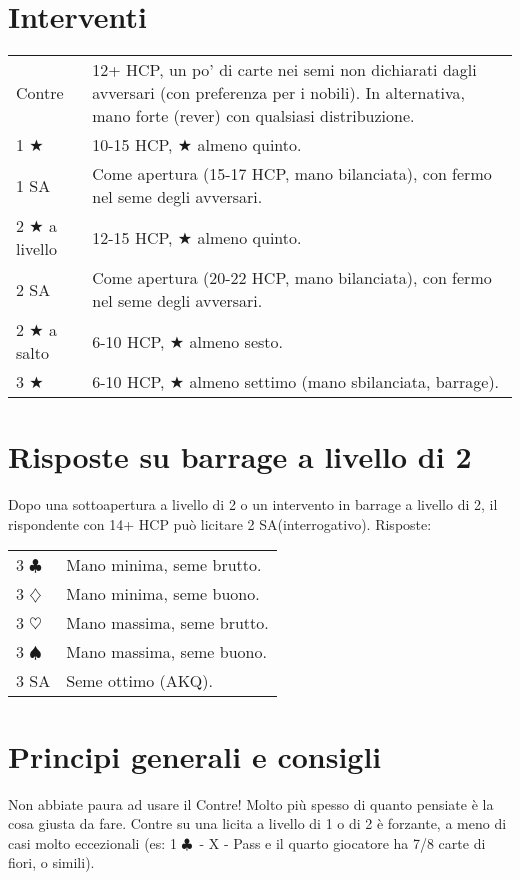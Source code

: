 \documentclass[a4paper,10pt]{article}
\renewcommand{\c}{$\clubsuit$\xspace}
\renewcommand{\d}{$\diamondsuit$\xspace}
\newcommand{\h}{$\heartsuit$\xspace}
\newcommand{\s}{$\spadesuit$\xspace}
\renewcommand{\j}{$\bigstar$\xspace}
\newcommand{\sa}{SA\xspace}
\newcommand{\smallspace}{\vskip0.3cm}
\newenvironment{twocol}
  {\smallspace\noindent\begin{tabular}{l p{0.78\textwidth}}}
  {\end{tabular}\smallspace}
\begin{document}
\section{Interventi}

\begin{twocol}
	Contre & 12+ HCP, un po' di carte nei semi non dichiarati dagli avversari (con preferenza per i nobili). In alternativa, mano forte (rever) con qualsiasi distribuzione.\\
	1 \j & 10-15 HCP, \j almeno quinto.\\
	1 \sa & Come apertura (15-17 HCP, mano bilanciata), con fermo nel seme degli avversari.\\
	2 \j a livello & 12-15 HCP, \j almeno quinto.\\
	2 \sa & Come apertura (20-22 HCP, mano bilanciata), con fermo nel seme degli avversari.\\
	2 \j a salto & 6-10 HCP, \j almeno sesto. \\
	3 \j & 6-10 HCP, \j almeno settimo (mano sbilanciata, barrage).
\end{twocol}

\section{Risposte su barrage a livello di 2}

Dopo una sottoapertura a livello di 2 o un intervento in barrage a livello di 2, il rispondente con 14+ HCP può licitare 2 \sa (interrogativo). Risposte:
\begin{twocol}
	3 \c & Mano minima, seme brutto.\\
	3 \d & Mano minima, seme buono.\\
	3 \h & Mano massima, seme brutto.\\
	3 \s & Mano massima, seme buono.\\
	3 SA & Seme ottimo (AKQ).
\end{twocol}


\section{Principi generali e consigli}

\indent

Non abbiate paura ad usare il Contre! Molto più spesso di quanto pensiate è la cosa giusta da fare. Contre su una licita a livello di 1 o di 2 è forzante, a meno di casi molto eccezionali (es: 1 \c\ - X - Pass e il quarto giocatore ha 7/8 carte di fiori, o simili).
\end{document}

